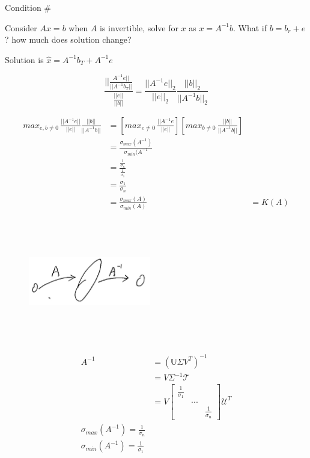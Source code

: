 Condition \#

Consider $Ax = b$ when $A$ is invertible, solve for $x$ as $x = A^{-1}b$. What if $b = b_r + e$? how much does solution change? 

Solution is $\hat{x} = A^{-1}b_T + A^{-1}e$

\begin{equation*}
\frac{||\frac{A^{-1}e||}{||A^{-1}b_T||}}{\frac{||e||}{||b||}} = \frac{||A^{-1}e||_2}{||e||_2} \frac{||b||_2}{||A^{-1}b||_2}
\end{equation*}

\begin{align*}
max_{e,b\neq 0} \, \frac{||A^{-1}e||}{||e||} \frac{||b||}{||A^{-1}b||} &= \left[max_{e\neq 0}\, \frac{||A^{-1}e}{||e||}\right]\left[max_{b\neq 0}\, \frac{||b||}{||A^{-1}b||}\right]\\
&= \frac{\sigma_{max}(A^{-1})}{\sigma_{min}(A^{-1}}\\
&= \frac{\frac{1}{\sigma_n}}{\frac{1}{\sigma_1}}\\
&= \frac{\sigma_1}{\sigma_n}\\
&= \frac{\sigma_{max}(A)}{\sigma_{min}(A)}
&= K(A)
\end{align*}

\begin{figure}
	\centering
	\includegraphics[width=2.1in,height=2.1in]{figures/ch05/figure2.jpg}
\end{figure}

\begin{align}
A^{-1} &= (\mathbb{U}\Sigma V^T)^{-1} \\
&= V\Sigma^{-1}\mathcal{T}\\
&= V
\begin{bmatrix}
\frac{1}{\sigma_1} & &\\
& ... & \\
& & \frac{1}{\sigma_n}
\end{bmatrix}
\mathcal{U}^T\\
\sigma_{max}(A^{-1}) = \frac{1}{\sigma_n}\\
\sigma_{min}(A^{-1}) = \frac{1}{\sigma_1}
\end{align}
